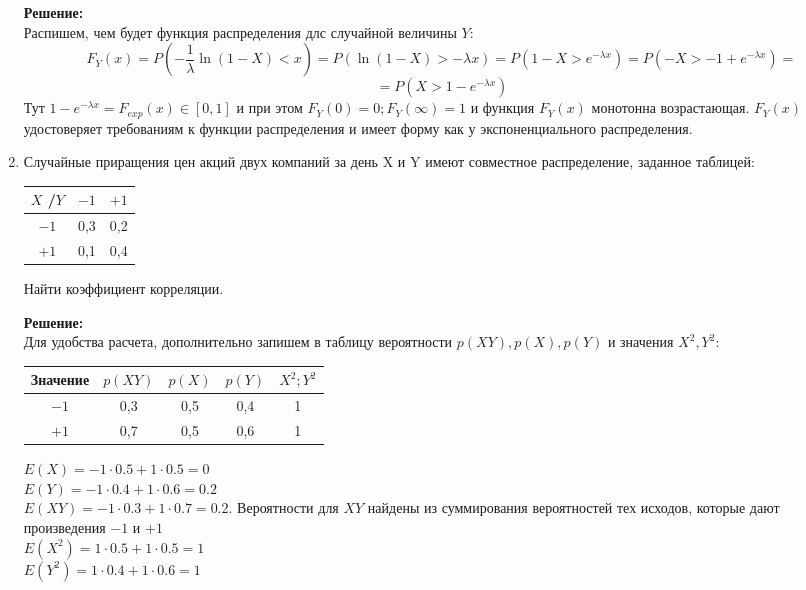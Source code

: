 \documentclass[a4paper,12pt]{article}
\begin{document}
\begin{enumerate}
\textbf{Решение:}\\
Распишем, чем будет функция распределения длс случайной величины $Y$:
$$F_Y(x) = P(-\frac{1}{\lambda}\ln{(1-X)}<x) = P(\ln{(1-X) > -\lambda x})= P(1-X > e^{-\lambda x})=P(-X >-1+e^{-\lambda x})=$$
$$=P(X >1-e^{-\lambda x})$$
Тут $1-e^{-\lambda x} = F_{exp}(x) \in [0,1]$ и при этом $F_Y(0)=0; F_Y(\infty)=1$ и функция $F_Y(x)$ монотонна возрастающая. $F_Y(x)$ удостоверяет требованиям к функции распределения и имеет форму как у экспоненциального распределения.



\item	 Случайные приращения цен акций двух компаний за день X и Y имеют совместное распределение, заданное таблицей:
\begin{center}
 \begin{tabular}{|c| c| c |} 
 \hline
 $X$ \slash $Y$ & $-1$& $+1$ \\ [0.5ex] 
 \hline
 $-1$ & 0,3 & 0,2 \\ 
 \hline
 $+1$ & 0,1	 & 0,4  \\ 
 \hline
\end{tabular}
\end{center}

Найти коэффициент корреляции.

\textbf{Решение:}\\

Для удобства расчета, дополнительно запишем в таблицу вероятности $p(XY), p(X), p(Y)$ и значения $X^2, Y^2$:

\begin{center}
 \begin{tabular}{|c|c|c| c| c |} 
 \hline
 Значение & $p(XY)$& $p(X)$& $p(Y)$&$X^2; Y^2$ \\ [0.5ex] 
 \hline
 $-1$ & 0,3 & 0,5&0,4&1 \\ 
 \hline
 $+1$ & 0,7	 & 0,5&0,6&1  \\ 
 \hline
\end{tabular}
\end{center}
$E(X) = -1 \cdot 0.5 + 1\cdot 0.5=0$\\
$E(Y) = -1 \cdot 0.4 + 1\cdot 0.6=0.2$\\
$E(XY) = -1 \cdot 0.3 + 1\cdot 0.7=0.2$. Вероятности для $XY$ найдены из суммирования вероятностей тех исходов, которые дают произведения $-1$ и $+1$\\
$E(X^2) = 1 \cdot 0.5 + 1\cdot 0.5=1$\\
$E(Y^2) = 1 \cdot 0.4 + 1\cdot 0.6=1$\\


\end{enumerate}
\end{document}
